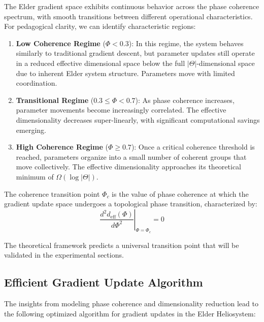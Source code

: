 The Elder gradient space exhibits continuous behavior across the phase coherence spectrum, with smooth transitions between different operational characteristics. For pedagogical clarity, we can identify characteristic regions:

\begin{enumerate}
    \item \textbf{Low Coherence Regime} ($\Phi < 0.3$): In this regime, the system behaves similarly to traditional gradient descent, but parameter updates still operate in a reduced effective dimensional space below the full $|\Theta|$-dimensional space due to inherent Elder system structure. Parameters move with limited coordination.
    
    \item \textbf{Transitional Regime} ($0.3 \leq \Phi < 0.7$): As phase coherence increases, parameter movements become increasingly correlated. The effective dimensionality decreases super-linearly, with significant computational savings emerging.
    
    \item \textbf{High Coherence Regime} ($\Phi \geq 0.7$): Once a critical coherence threshold is reached, parameters organize into a small number of coherent groups that move collectively. The effective dimensionality approaches its theoretical minimum of $\Omega(\log|\Theta|)$.
\end{enumerate}

\begin{definition}
The coherence transition point $\Phi_c$ is the value of phase coherence at which the gradient update space undergoes a topological phase transition, characterized by:
\begin{equation}
\left. \frac{d^2 d_{\text{eff}}(\Phi)}{d\Phi^2} \right|_{\Phi=\Phi_c} = 0
\end{equation}
\end{definition}

The theoretical framework predicts a universal transition point that will be validated in the experimental sections.



\subsection{Efficient Gradient Update Algorithm}

The insights from modeling phase coherence and dimensionality reduction lead to the following optimized algorithm for gradient updates in the Elder Heliosystem:

